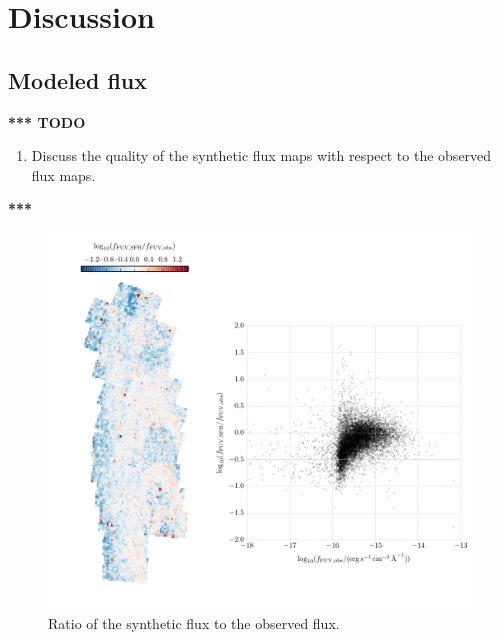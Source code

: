\section{Discussion}\label{mfx:discussion}

\subsection{Modeled flux}

\textbf{*** TODO}

\begin{enumerate}
\item Discuss the quality of the synthetic flux maps with respect to the
    observed flux maps.
\end{enumerate}

\textbf{***}


\begin{figure}
\centering
\includegraphics[width=\textwidth]{m31flux-figures/flux_fuv_sfh-vs-obs.pdf}
\caption[Ratio of the synthetic \fuv{} flux to the observed \fuv{} flux.]{Ratio
    of the synthetic \fuv{} flux to the observed \fuv{} flux.
}
\label{fig:mfx:fuvfluxratio}
\end{figure}


